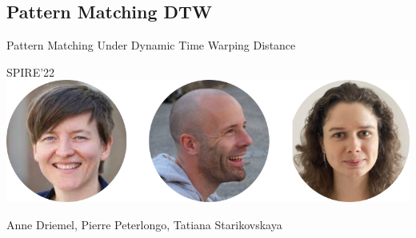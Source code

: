 \subsection{Pattern Matching DTW}
\newcommand{\dd}{\mathinner{..}}

\begin{frame}
  \centering
  {\Large Pattern Matching Under Dynamic Time Warping Distance}

  \bigskip
  {\large SPIRE'22}\\
  \bigskip
  \includegraphics{pictures/mindmap/dtw.png}

  \bigskip
  Anne Driemel, Pierre Peterlongo, Tatiana Starikovskaya
\end{frame}

